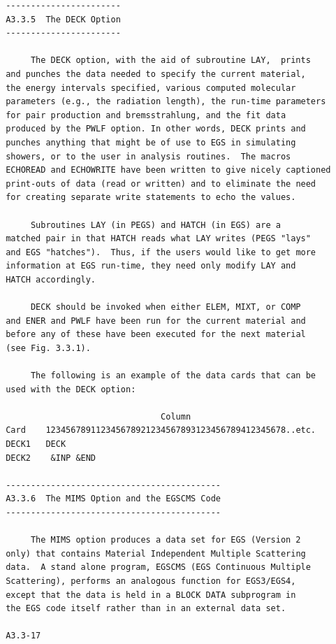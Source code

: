 \newpage {} \begin{verbatim}
 -----------------------
 A3.3.5  The DECK Option
 -----------------------
 
      The DECK option, with the aid of subroutine LAY,  prints
 and punches the data needed to specify the current material,
 the energy intervals specified, various computed molecular
 parameters (e.g., the radiation length), the run-time parameters
 for pair production and bremsstrahlung, and the fit data
 produced by the PWLF option. In other words, DECK prints and
 punches anything that might be of use to EGS in simulating
 showers, or to the user in analysis routines.  The macros
 ECHOREAD and ECHOWRITE have been written to give nicely captioned
 print-outs of data (read or written) and to eliminate the need
 for creating separate write statements to echo the values.
 
      Subroutines LAY (in PEGS) and HATCH (in EGS) are a
 matched pair in that HATCH reads what LAY writes (PEGS "lays"
 and EGS "hatches").  Thus, if the users would like to get more
 information at EGS run-time, they need only modify LAY and
 HATCH accordingly.
 
      DECK should be invoked when either ELEM, MIXT, or COMP
 and ENER and PWLF have been run for the current material and
 before any of these have been executed for the next material
 (see Fig. 3.3.1).
 
      The following is an example of the data cards that can be
 used with the DECK option:
 
                                Column
 Card    123456789112345678921234567893123456789412345678..etc.
 DECK1   DECK
 DECK2    &INP &END
 
 -------------------------------------------
 A3.3.6  The MIMS Option and the EGSCMS Code
 -------------------------------------------
 
      The MIMS option produces a data set for EGS (Version 2
 only) that contains Material Independent Multiple Scattering
 data.  A stand alone program, EGSCMS (EGS Continuous Multiple
 Scattering), performs an analogous function for EGS3/EGS4,
 except that the data is held in a BLOCK DATA subprogram in
 the EGS code itself rather than in an external data set.

 A3.3-17
\end{verbatim} 
